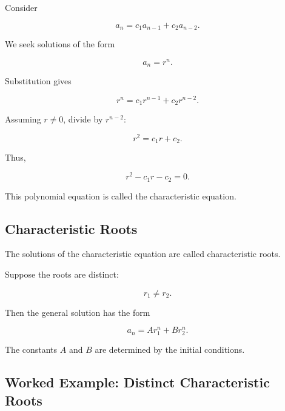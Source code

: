 Consider

\[
\boxed{
a_n
=
c_1a_{n-1}
+
c_2a_{n-2}.
}
\]

We seek solutions of the form

\[
a_n=r^n.
\]

Substitution gives

\[
r^n
=
c_1r^{n-1}
+
c_2r^{n-2}.
\]

Assuming \(r\neq0\), divide by \(r^{n-2}\):

\[
r^2
=
c_1r+c_2.
\]

Thus,

\[
\boxed{
r^2-c_1r-c_2=0.
}
\]

This polynomial equation is called the characteristic equation.

\subsection{Characteristic Roots}
\label{subsec:characteristic-roots}

The solutions of the characteristic equation are called characteristic
roots.

Suppose the roots are distinct:

\[
r_1\neq r_2.
\]

Then the general solution has the form

\[
\boxed{
a_n
=
A r_1^n
+
B r_2^n.
}
\]

The constants \(A\) and \(B\) are determined by the initial conditions.

\subsection{Worked Example: Distinct Characteristic Roots}
\label{subsec:worked-distinct-roots}

